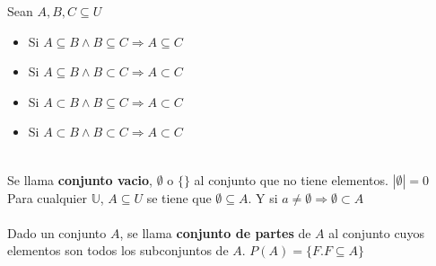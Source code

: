 \documentclass[11pt,a4paper]{article}
\begin{document}
Sean $A, B, C \subseteq U$
\begin{multicols}{2}
\begin{itemize}
\item Si $A \subseteq B \land B \subseteq C \Rightarrow A \subseteq C$
\item Si $A \subseteq B \land B \subset C \Rightarrow A \subset C$
\item Si $A \subset B \land B \subseteq C \Rightarrow A \subset C$
\item Si $A \subset B \land B \subset C \Rightarrow A \subset C$
\end{itemize}
\end{multicols}
\noindent \dotfill\\

Se llama \textbf{conjunto vacio}, $\emptyset$ o $\{\}$ al conjunto que no tiene elementos. $|\emptyset| = 0$\\

Para cualquier $\mathbb{U}$, $A \subseteq U$ se tiene que $\emptyset \subseteq A$. Y si $a \not = \emptyset \Rightarrow \emptyset \subset A$\\

\noindent \dotfill\\

Dado un conjunto $A$, se llama \textbf{conjunto de partes} de $A$ al conjunto cuyos elementos son todos los subconjuntos de $A$. $P(A) = \{ F . F \subseteq A \}$\\

\noindent \dotfill\\
\newpage
\end{document}
